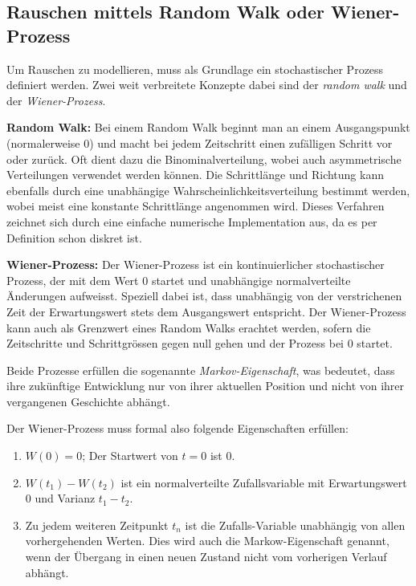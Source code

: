 \subsection{Rauschen mittels Random Walk oder Wiener-Prozess\label{brown:Rauschen:RandomWalkWiener}}

Um Rauschen zu modellieren, muss als Grundlage ein stochastischer Prozess definiert werden. Zwei weit verbreitete Konzepte dabei sind der \textit{random walk} und der \textit{Wiener-Prozess}.

\begin{definition}\textbf{Random Walk:}
	\label{randomWalk}
	Bei einem Random Walk beginnt man an einem Ausgangspunkt (normalerweise 0) und macht bei jedem Zeitschritt einen zufälligen Schritt vor oder zurück. Oft dient dazu die Binominalverteilung, wobei auch asymmetrische Verteilungen verwendet werden können. Die Schrittlänge und Richtung kann ebenfalls durch eine unabhängige Wahrscheinlichkeitsverteilung bestimmt werden, wobei meist eine konstante Schrittlänge angenommen wird. Dieses Verfahren zeichnet sich durch eine einfache numerische Implementation aus, da es per Definition schon diskret ist.
\end{definition}

\begin{definition}\textbf{Wiener-Prozess:}
	\label{wienerprozess}
	Der Wiener-Prozess ist ein kontinuierlicher stochastischer Prozess, der mit dem Wert 0 startet und unabhängige normalverteilte Änderungen aufweisst. Speziell dabei ist, dass unabhängig von der verstrichenen Zeit der Erwartungswert stets dem Ausgangswert entspricht. Der Wiener-Prozess kann auch als Grenzwert eines Random Walks erachtet werden, sofern die Zeitschritte und Schrittgrössen gegen null gehen und der Prozess bei 0 startet. 
\end{definition}

Beide Prozesse erfüllen die sogenannte \textit{Markov-Eigenschaft}, was bedeutet, dass ihre zukünftige Entwicklung nur von ihrer aktuellen Position und nicht von ihrer vergangenen Geschichte abhängt.

Der Wiener-Prozess muss formal also folgende Eigenschaften erfüllen: 

\begin{enumerate}
	\item $ W(0) = 0 $; Der Startwert von $ t = 0 $ ist 0.
	\item $ W(t_{1}) - W(t_{2}) $ ist ein normalverteilte Zufallsvariable mit Erwartungswert 0 und Varianz $ t_{1} - t_{2} $.
	\item Zu jedem weiteren Zeitpunkt $ t_{n} $ ist die Zufalls-Variable unabhängig von allen vorhergehenden Werten. Dies wird auch die Markow-Eigenschaft genannt, wenn der Übergang in einen neuen Zustand nicht vom vorherigen Verlauf abhängt.
\end{enumerate}

